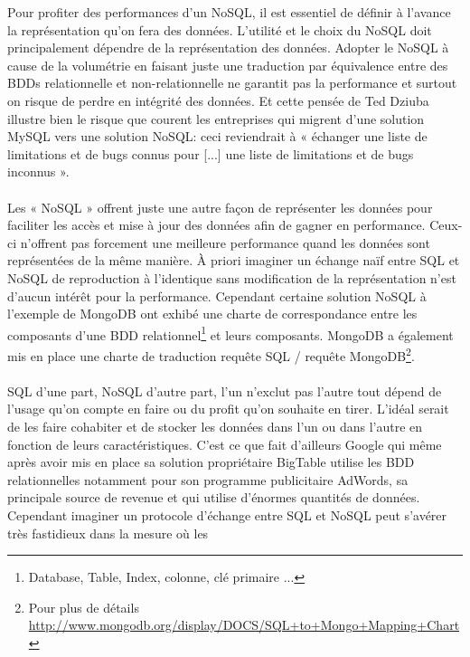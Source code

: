 Pour profiter des performances d'un \textsf{NoSQL}, il est essentiel
de définir à l'avance la représentation qu'on fera des
données. L'utilité et le choix du \textsf{NoSQL} doit principalement
dépendre de la représentation des données. Adopter le \textsf{NoSQL} à
cause de la volumétrie en faisant juste une traduction par équivalence
entre des \textsf{BDDs} relationnelle et non-relationnelle ne garantit
pas la performance et surtout on risque de perdre en intégrité des
données. Et cette pensée de \textsf{Ted Dziuba} illustre bien le risque que
courent les entreprises qui migrent d'une solution \textsf{MySQL} vers  une 
solution \textsf{NoSQL}: ceci reviendrait à « {\sf échanger une liste de limitations 
et de bugs connus pour [...] une liste de limitations et de bugs inconnus} »\cite{DieNosql}.
\\ \\ Les « \textsf{NoSQL} » offrent juste une autre façon
de représenter les données pour faciliter les accès et mise à jour des
données afin de gagner en performance. Ceux-ci n'offrent pas forcement
une meilleure performance quand les données sont représentées de la
même manière. À priori imaginer un échange naïf entre \textsf{SQL} et
\textsf{NoSQL} de reproduction à l'identique sans modification de la
représentation n'est d'aucun intérêt pour la performance. Cependant
certaine solution \textsf{NoSQL} à l'exemple de \textsf{MongoDB} ont
exhibé une charte de correspondance entre les composants d'une
\textsf{BDD} relationnel\footnote{Database, Table, Index, colonne, clé
  primaire ...} et leurs composants. \textsf{MongoDB} a également mis
en place une charte de traduction requête \textsf{SQL} / requête
\textsf{MongoDB}\footnote{Pour plus de détails
  \url{http://www.mongodb.org/display/DOCS/SQL+to+Mongo+Mapping+Chart}}.
\\
\\
\textsf{SQL} d'une part, \textsf{NoSQL} d'autre part, l'un n'exclut pas l'autre
tout dépend de l'usage qu'on compte en faire ou du profit qu'on
souhaite en tirer. L'idéal serait de les faire cohabiter et de stocker
les données dans l'un ou dans l'autre en fonction de leurs
caractéristiques. C'est ce que fait d'ailleurs \textsf{Google} qui
même après avoir mis en place sa solution
propriétaire \textsf{BigTable} utilise les \textsf{BDD} relationnelles
notamment pour son programme publicitaire \textsf{AdWords}, sa
principale source de revenue et qui utilise d'énormes quantités de
données. Cependant imaginer un protocole d'échange entre \textsf{SQL}
et \textsf{NoSQL} peut s'avérer très fastidieux dans la mesure où les
